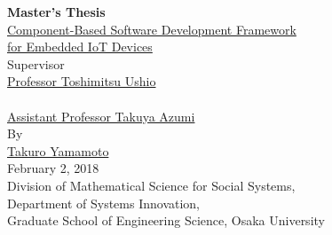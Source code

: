 \documentclass[a4j,12pt,oneside,openany,english]{jsbook}
\begin{document}
\thispagestyle{empty}
\begin{center}
\vspace*{5mm}
{\Huge {\bf Master's Thesis}}\\
\vspace{2cm}
\underline{\LARGE{Component-Based Software Development Framework}} \\
\vspace{0.5cm}
\underline{\LARGE{for Embedded IoT Devices}} \\
\vspace{12mm}
{\large Supervisor}\\
\vspace{6mm}
\underline{\Large Professor Toshimitsu Ushio}\\
　\\
\underline{\Large Assistant Professor Takuya Azumi}\\
\vspace{8mm}
{\large By}\\
\vspace{6mm}
\underline{\Large Takuro Yamamoto}\\
\vspace{10mm}
{\Large February 2, 2018}\\
\vspace{14mm}
{\Large Division of Mathematical Science for Social Systems,}\\
{\Large Department of Systems Innovation,}\\
{\Large Graduate School of Engineering Science, Osaka University}\\
\end{center}
\clearpage
\setcounter{page}{0}
\end{document}

